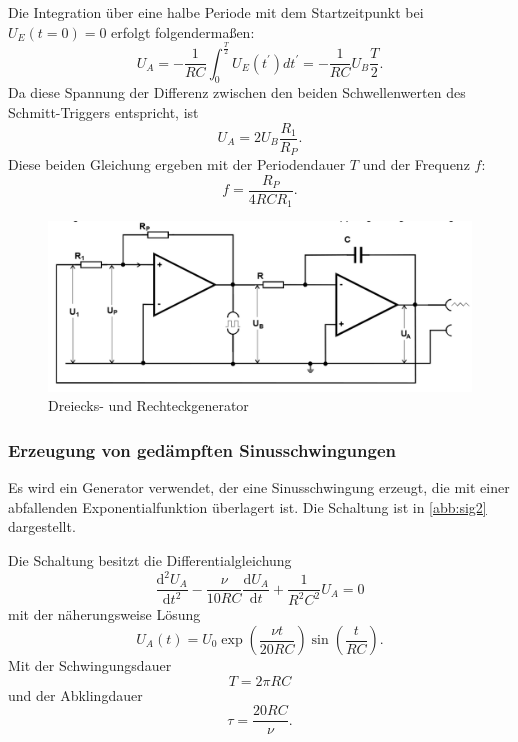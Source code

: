 Die Integration über eine halbe Periode mit dem Startzeitpunkt bei $U_E(t=0) = 0$ erfolgt folgendermaßen:
\begin{equation}
U_A = - \frac{1}{RC} \int_{0}^{\frac{T}{2}} U_E(t^\prime)dt^\prime = -\frac{1}{RC} U_B \frac{T}{2} .
\label{integral}
\end{equation}
Da diese Spannung der Differenz zwischen den beiden Schwellenwerten des Schmitt-Triggers entspricht, ist
\begin{equation}
U_A = 2U_B\frac{R_1}{R_P} .
\label{differenz}
\end{equation}
Diese beiden Gleichung ergeben mit der Periodendauer $T$ und der Frequenz $f$:
\begin{equation}
f = \frac{R_P}{4RCR_1} .
\label{frequenz}
\end{equation}
\begin{figure}[h!]
 	\centering
 	\includegraphics[width=\textwidth]{img/gen.png}
 	\caption{Dreiecks- und Rechteckgenerator \cite{FP}}
 	\label{abb:sig}
\end{figure}

\subsubsection{Erzeugung von ged{\"a}mpften Sinusschwingungen}
Es wird ein Generator verwendet, der eine Sinusschwingung erzeugt, die mit einer abfallenden Exponentialfunktion überlagert ist. Die Schaltung ist in \autoref{abb:sig2} dargestellt.

\noindent Die Schaltung besitzt die Differentialgleichung
\begin{equation}
\frac{\text{d}^2 U_A}{\text{d}t^2} - \frac{\nu}{10RC} \frac{\text{d} U_A}{\text{d}t} + \frac{1}{R^2 C^2} U_A = 0
\end{equation}
mit der näherungsweise Lösung
\begin{equation}
U_A(t) = U_0 \exp\left(\frac{\nu t}{20 RC}\right) \sin\left(\frac{t}{RC}\right) .
\end{equation}
Mit der Schwingungsdauer
\begin{equation}
T = 2\pi RC
\end{equation}
und der Abklingdauer
\begin{equation}
\tau = \frac{20 RC}{\nu} .
\end{equation}

